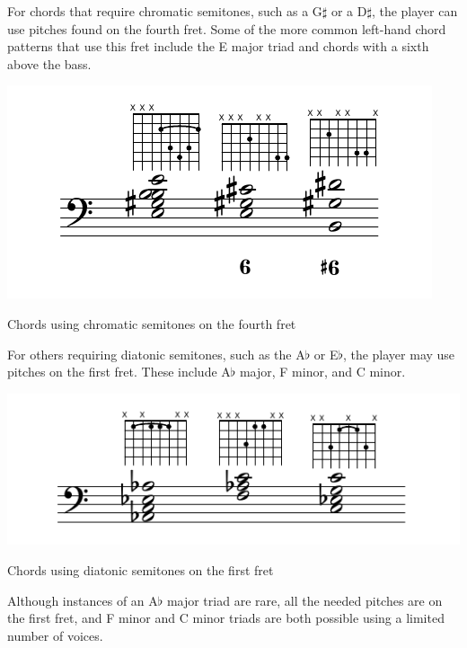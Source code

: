 For chords that require chromatic semitones, such as a G$\sharp$ or a D$\sharp$, the
player can use pitches found on the fourth fret. Some of the more common left-hand chord
patterns that use this fret include the E major triad and chords with a
sixth above the bass.
\begin{example}[h]
\centering
\includegraphics{examples/g-sharp.pdf}
\caption{Chords using chromatic semitones on the fourth fret}
\label{fourth-fret-chords}
\end{example}
For others requiring diatonic semitones, such as the A$\flat$ or E$\flat$, the
player may use pitches on the first fret. These include A$\flat$ major, F minor, and C
minor.
\begin{example}[h]
\centering
\includegraphics{examples/a-flat.pdf}
\caption{Chords using diatonic semitones on the first fret}
\label{first-fret-chords}
\end{example}
Although instances of an A$\flat$ major triad are rare, all the needed pitches are on
the first fret, and F minor and C minor triads are both possible using a limited
number of voices.

